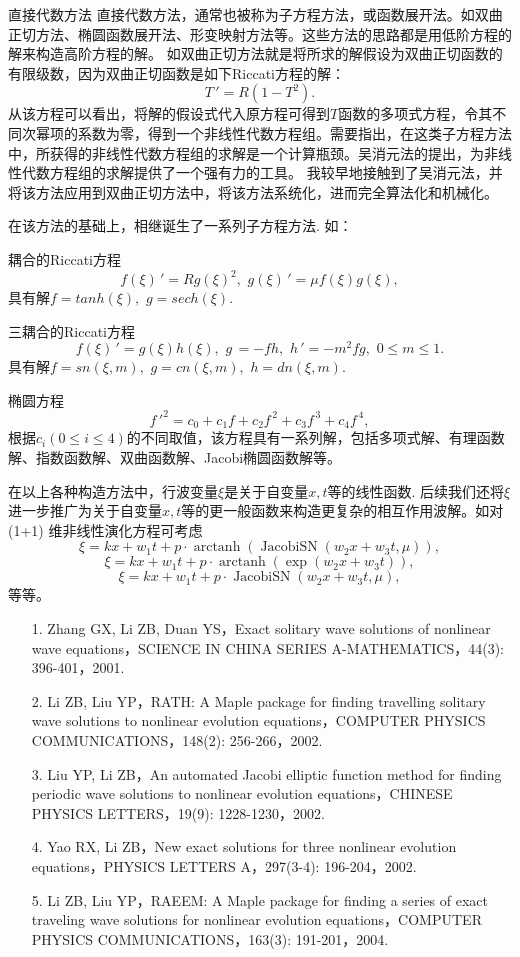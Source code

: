 \documentclass{beamer}
\DeclareMathOperator{\arctanh}{arctanh}
\DeclareMathOperator{\JacobiSN}{JacobiSN}
\begin{document}
\begin{frame}{直接代数方法}
直接代数方法，通常也被称为子方程方法，或函数展开法。如双曲正切方法、椭圆函数展开法、形变映射方法等。这些方法的思路都是用低阶方程的解来构造高阶方程的解。
如双曲正切方法就是将所求的解假设为双曲正切函数的有限级数，因为双曲正切函数是如下Riccati方程的解：
\[
   T\,'=R(1-T^2).  
\]
从该方程可以看出，将解的假设式代入原方程可得到$T$函数的多项式方程，令其不同次幂项的系数为零，得到一个非线性代数方程组。需要指出，在这类子方程方法中，所获得的非线性代数方程组的求解是一个计算瓶颈。吴消元法的提出，为非线性代数方程组的求解提供了一个强有力的工具。
我较早地接触到了吴消元法，并将该方法应用到双曲正切方法中，将该方法系统化，进而完全算法化和机械化。
\end{frame}
\begin{frame}
  在该方法的基础上，相继诞生了一系列子方程方法. 如： 
  
  耦合的Riccati方程
  \[
    f(\xi)\,'=Rg(\xi)^2,\,\,g(\xi)\,'=\mu f(\xi) g(\xi),
  \]
  具有解$f=tanh(\xi),\,\,g=sech(\xi)$. 
 
  三耦合的Riccati方程
  \[
    f(\xi)\,'=g(\xi)h(\xi),\,\,g\,=-fh,\,\,h\,'=-m^2fg,\,\, 0\leq m \leq 1.
  \]
  具有解$f=sn(\xi,m),\,\,g=cn(\xi,m),\,\,h=dn(\xi,m).$
  
  椭圆方程
  \[
      {f\,'}^2=c_0+c_1 f +c_2 f^{\,2}+c_3f^{\,3}+c_4f^{\,4},  
  \]
  根据$c_i(0 \le i \le 4)$的不同取值，该方程具有一系列解，包括多项式解、有理函数解、指数函数解、双曲函数解、Jacobi椭圆函数解等。
\end{frame}
\begin{frame}
在以上各种构造方法中，行波变量$\xi$是关于自变量$x,t$等的线性函数. 后续我们还将$\xi$进一步推广为关于自变量$x,t$等的更一般函数来构造更复杂的相互作用波解。如对(1+1) 维非线性演化方程可考虑
\[
  \xi=kx+w_1t+p\cdot\arctanh (\JacobiSN(w_2x+w_3t,\mu)),
\] 
\[
  \xi=kx+w_1t+p\cdot\arctanh (\exp(w_2x+w_3t)),
\]
\[
  \xi=kx+w_1t+p\cdot \JacobiSN(w_2x+w_3t,\mu),
\]  
等等。
\end{frame}
\begin{frame}
 \begin{itemize}
  \item[1.] Zhang GX, Li ZB, Duan YS，Exact solitary wave solutions of nonlinear wave equations，SCIENCE IN CHINA SERIES A-MATHEMATICS，44(3): 396-401，2001.
  \item[2.] Li ZB, Liu YP，RATH: A Maple package for finding travelling solitary wave solutions to nonlinear evolution equations，COMPUTER PHYSICS COMMUNICATIONS，148(2): 256-266，2002.
  \item[3.] Liu YP, Li ZB，An automated Jacobi elliptic function method for finding periodic wave solutions to nonlinear evolution equations，CHINESE PHYSICS LETTERS，19(9): 1228-1230，2002.
  \item[4.] Yao RX, Li ZB，New exact solutions for three nonlinear evolution equations，PHYSICS LETTERS A，297(3-4): 196-204，2002.
  \item[5.] Li ZB, Liu YP，RAEEM: A Maple package for finding a series of exact traveling wave solutions for nonlinear evolution equations，COMPUTER PHYSICS COMMUNICATIONS，163(3): 191-201，2004.
  \end{itemize}
\end{frame}
\end{document}
